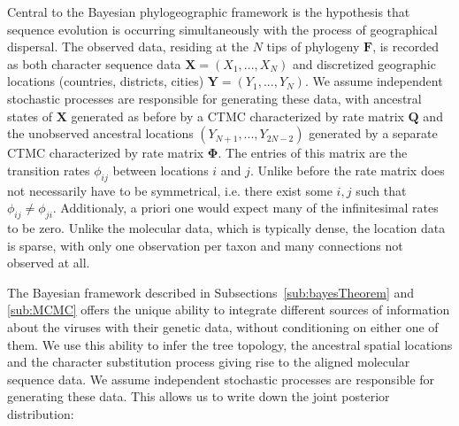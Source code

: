 Central to the Bayesian phylogeographic framework is the hypothesis that sequence evolution is occurring simultaneously with the process of geographical dispersal. 
The observed data, residing at the $N$ tips of phylogeny $\mathbf{F}$, is recorded as both character sequence data $\mathbf{X}=(X_{1},...,X_{N})$ and discretized geographic locations (countries, districts, cities) $\mathbf{Y}=(Y_{1},...,Y_{N})$.
We assume independent stochastic processes are responsible for generating these data, with ancestral states of $\mathbf{X}$ generated as before by a CTMC characterized by rate matrix $\mathbf{Q}$ and the unobserved ancestral locations $(Y_{N+1},...,Y_{2N-2})$ generated by a separate CTMC characterized by rate matrix $\mathbf{\Phi}$.
The entries of this matrix are the transition rates $\phi_{ij}$ between locations $i$ and $j$.
Unlike before the rate matrix does not necessarily have to be symmetrical, i.e. there exist some $i,j$ such that $\phi_{ij}\neq\phi_{ji}$.
Additionaly, a priori one would expect many of the infinitesimal rates to be zero. 
Unlike the molecular data, which is typically dense, the location data is sparse, with only one observation per taxon and many connections not observed at all.

The Bayesian framework described in Subsections~\ref{sub:bayesTheorem} and \ref{sub:MCMC} offers the unique ability to integrate different sources of information about the viruses with their genetic data, without conditioning on either one of them.
We use this ability to infer the tree topology, the ancestral spatial locations and the character substitution process giving rise to the aligned molecular sequence data. 
We assume independent stochastic processes are responsible for generating these data.
This allows us to write down the joint posterior distribution: 



